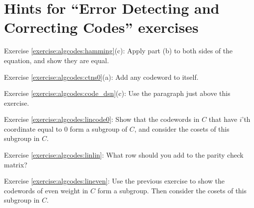 \section{Hints for ``Error Detecting and Correcting Codes'' exercises}\label{sec:algcodes:hints} 


Exercise \ref{exercise:algcodes:hamming}(c): Apply part (b) to both sides of the equation, and show they are equal.


\noindent Exercise \ref{exercise:algcodes:ctns0}(a): Add any codeword to itself.

\noindent Exercise \ref{exercise:algcodes:code_dsn}(c): Use the  paragraph just above this exercise.

\noindent Exercise \ref{exercise:algcodes:lincode0}: Show that the codewords in $C$ that have $i$'th coordinate equal to 0 form a subgroup of $C$, and consider the cosets of this subgroup in $C$.

\noindent Exercise \ref{exercise:algcodes:linlin}:  What row should you add to the parity check matrix?

\noindent Exercise \ref{exercise:algcodes:lineven}:  Use the previous exercise to show the codewords of even weight in $C$ form a subgroup. Then consider the cosets of this subgroup in $C$.
